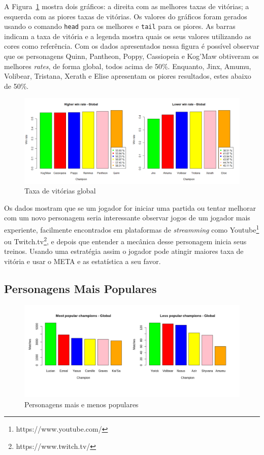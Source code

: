 \documentclass[a4paper]{article}
\begin{document}
A Figura~\ref{fig:win_rate} mostra dois gráficos: a direita com as melhores taxas de vitórias; a esquerda com as piores taxas de vitórias. Os valores do gráficos foram gerados usando o comando \texttt{head} para os melhores e \texttt{tail} para os piores. As barras indicam a taxa de vitória e a legenda mostra quais os seus valores utilizando as cores como referência. Com os dados apresentados nessa figura é possível observar que os personagens Quinn, Pantheon, Poppy, Cassiopeia e Kog’Maw obtiveram os melhores \textit{rates}, de forma global, todos acima de 50\%. Enquanto, Jinx, Amumu, Volibear, Tristana, Xerath e Elise apresentam os piores resultados, estes abaixo de 50\%. 

\begin{figure}[ht]
\centering
\includegraphics[width=1\columnwidth]{imagens/Rplot}
\caption{\label{fig:win_rate}Taxa de vitórias global}
\end{figure}

Os dados mostram que se um jogador for iniciar uma partida ou tentar melhorar com um novo personagem seria interessante observar jogos de um jogador mais experiente, facilmente encontrados em plataformas de \textit{streamming} como Youtube\footnote{https://www.youtube.com/} ou Twitch.tv\footnote{https://www.twitch.tv/}, e depois que entender a mecânica desse personagem inicia seus treinos. Usando uma estratégia assim o jogador pode atingir maiores taxa de vitória e usar o META e as estatística a seu favor.

\subsection{Personagens Mais Populares}
\begin{figure}[ht]
\centering
\includegraphics[width=1\columnwidth]{imagens/less_most_popular}
\caption{\label{fig:popular}Personagens mais e menos populares}
\end{figure}
\end{document}
